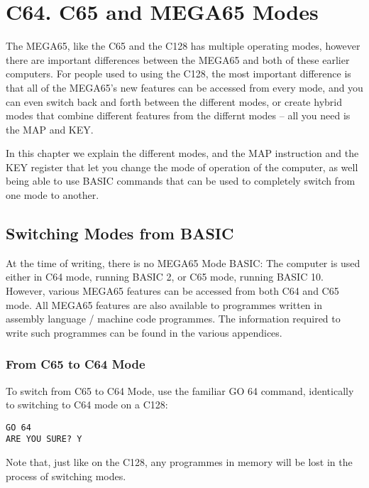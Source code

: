 \chapter {C64. C65 and MEGA65 Modes}

The MEGA65, like the C65 and the C128 has multiple operating modes,
however there are important differences between the MEGA65 and both
of these earlier computers.  For people used to using the C128,
the most important difference is that all of the MEGA65's new features
can be accessed from every mode, and you can even switch back and forth
between the different modes, or create hybrid modes that combine different
features from the differnt modes -- all you need is the MAP and KEY.

In this chapter we explain the different modes, and the MAP instruction and
the KEY register that let you change the mode of operation of the computer,
as well being able to use BASIC commands that can be used to completely switch
from one mode to another.

\section{Switching Modes from BASIC}

At the time of writing, there is no MEGA65 Mode BASIC: The computer is used either
in C64 mode, running BASIC 2, or C65 mode, running BASIC 10.  However, various MEGA65
features can be accessed from both C64 and C65 mode.  All MEGA65 features are also available
to programmes written in assembly language / machine code programmes.  The information required
to write such programmes can be found in the various appendices. 

\subsection{From C65 to C64 Mode}

To switch from C65 to C64 Mode, use the familiar GO 64 command, identically to switching to C64
mode on a C128:

\begin{tcolorbox}[colback=black,coltext=white]
\verbatimfont{\codefont}
\begin{verbatim}
GO 64
ARE YOU SURE? Y
\end{verbatim}
\end{tcolorbox}

Note that, just like on the C128, any programmes in memory will be lost in the process of switching modes.

